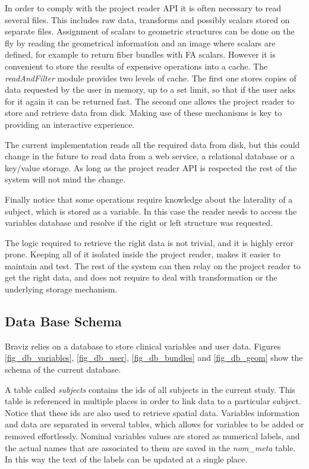 In order to comply with the project reader API it is often necessary to read several files. This includes raw data, transforms and possibly scalars stored on separate files. Assignment of scalars to geometric structures can be done on the fly by reading the geometrical information and an image where scalars are defined, for example to return fiber bundles with FA scalars. However it is convenient to store the results of expensive operations into a cache. The \emph{readAndFilter} module provides two levels of cache. The first one stores copies of data requested by the user in memory, up to a set limit, so that if the user asks for it again it can be returned fast. The second one allows the project reader to store and retrieve data from disk. Making use of these mechanisms is key to providing an interactive experience.

The current implementation reads all the required data from disk, but this could change in the future to read data from a web service, a relational database or a key/value storage. As long as the project reader API is respected the rest of the system will not mind the change.

Finally notice that some operations require knowledge about the laterality of a subject, which is stored as a variable. In this case the reader needs to access the variables database and resolve if the right or left structure was requested.

The logic required to retrieve the right data is not trivial, and it is highly error prone. Keeping all of it isolated inside the project reader, makes it easier to maintain and test. The rest of the system can then relay on the project reader to get the right data, and does not require to deal with transformation or the underlying storage mechanism.


\subsection{Data Base Schema}

Braviz relies on a database to store clinical variables and user data. Figures \ref{fig_db_variables}, \ref{fig_db_user}, \ref{fig_db_bundles} and \ref{fig_db_geom}  show the schema of the current database.

A table called \emph{subjects} contains the ids of all subjects in the current study. This table is referenced in multiple places in order to link data to a particular subject. Notice that these ids are also used to retrieve spatial data.
Variables information and data are separated in several tables, which allows for variables to be added or removed effortlessly. Nominal variables values are stored as numerical labels, and the actual names that are associated to them are saved in the \emph{nom\_meta} table. In this way the text of the labels can be updated at a single place.



